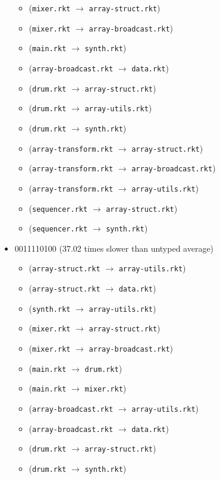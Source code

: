 \documentclass{article}
\newcommand{\mono}[1]{\texttt{#1}}
\begin{document}
\begin{itemize}
\begin{itemize}
  \item (\mono{mixer.rkt} $\rightarrow$ \mono{array-struct.rkt})
  \item (\mono{mixer.rkt} $\rightarrow$ \mono{array-broadcast.rkt})
  \item (\mono{main.rkt} $\rightarrow$ \mono{synth.rkt})
  \item (\mono{array-broadcast.rkt} $\rightarrow$ \mono{data.rkt})
  \item (\mono{drum.rkt} $\rightarrow$ \mono{array-struct.rkt})
  \item (\mono{drum.rkt} $\rightarrow$ \mono{array-utils.rkt})
  \item (\mono{drum.rkt} $\rightarrow$ \mono{synth.rkt})
  \item (\mono{array-transform.rkt} $\rightarrow$ \mono{array-struct.rkt})
  \item (\mono{array-transform.rkt} $\rightarrow$ \mono{array-broadcast.rkt})
  \item (\mono{array-transform.rkt} $\rightarrow$ \mono{array-utils.rkt})
  \item (\mono{sequencer.rkt} $\rightarrow$ \mono{array-struct.rkt})
  \item (\mono{sequencer.rkt} $\rightarrow$ \mono{synth.rkt})
  \end{itemize}
\item 0011110100 (37.02 times slower than untyped average)
  \begin{itemize}
  \item (\mono{array-struct.rkt} $\rightarrow$ \mono{array-utils.rkt})
  \item (\mono{array-struct.rkt} $\rightarrow$ \mono{data.rkt})
  \item (\mono{synth.rkt} $\rightarrow$ \mono{array-utils.rkt})
  \item (\mono{mixer.rkt} $\rightarrow$ \mono{array-struct.rkt})
  \item (\mono{mixer.rkt} $\rightarrow$ \mono{array-broadcast.rkt})
  \item (\mono{main.rkt} $\rightarrow$ \mono{drum.rkt})
  \item (\mono{main.rkt} $\rightarrow$ \mono{mixer.rkt})
  \item (\mono{array-broadcast.rkt} $\rightarrow$ \mono{array-utils.rkt})
  \item (\mono{array-broadcast.rkt} $\rightarrow$ \mono{data.rkt})
  \item (\mono{drum.rkt} $\rightarrow$ \mono{array-struct.rkt})
  \item (\mono{drum.rkt} $\rightarrow$ \mono{synth.rkt})

\end{itemize}
\end{itemize}
\end{document}

